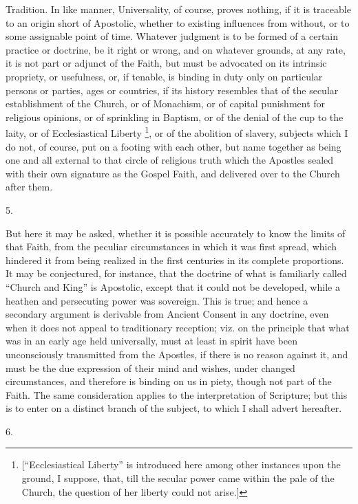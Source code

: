 Tradition. In like manner, Universality, of course, proves nothing, if
it is traceable to an origin short of Apostolic, whether to existing
influences from without, or to some assignable point of time. Whatever
judgment is to be formed of a certain practice or doctrine, be it
right or wrong, and on whatever grounds, at any rate, it is not part
or adjunct of the Faith, but must be advocated on its intrinsic
propriety, or usefulness, or, if tenable, is binding in duty only on
particular persons or parties, ages or countries, if its history
resembles that of the secular establishment of the Church, or of
Monachism, or of capital punishment for religious opinions, or of
sprinkling in Baptism, or of the denial of the cup to the laity, or of
Ecclesiastical Liberty \footnote{[``Ecclesiastical Liberty'' is
introduced here among other instances upon the ground, I suppose,
that, till the secular power came within the pale of the Church, the
question of her liberty could not arise.]},
or of the abolition of slavery, subjects which I do not, of course,
put on a footing with each other, but name together as being one and
all external to that circle of religious truth which the Apostles
sealed with their own signature as the Gospel Faith, and delivered
over to the Church after them.

5.

But here it may be asked, whether it is possible accurately to know
the limits of that Faith, from the peculiar circumstances in which it
was first spread, which hindered it from being realized in the first
centuries in its complete proportions. It may be conjectured, for
instance, that the doctrine of what is familiarly called ``Church
and King'' is Apostolic, except that it could not be developed,
while a heathen and persecuting power was sovereign. This is true; and hence a secondary argument is derivable from Ancient Consent
in any doctrine, even when it does not appeal to traditionary
reception; viz. on the principle that what was in an early age held
universally, must at least in spirit have been unconsciously
transmitted from the Apostles, if there is no reason against it, and
must be the due expression of their mind and wishes, under changed
circumstances, and therefore is binding on us in piety, though not
part of the Faith. The same consideration applies to the
interpretation of Scripture; but this is to enter on a distinct branch
of the subject, to which I shall advert hereafter.

6.

